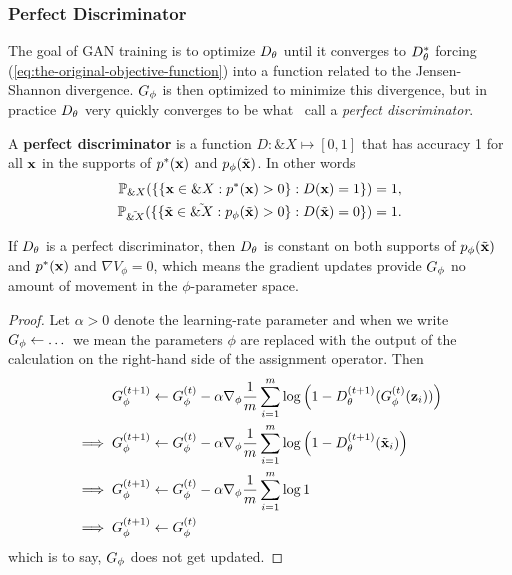 
\subsubsection*{Perfect Discriminator}

The goal of GAN training is to optimize $D_\theta$ until it converges to
$D_\theta^*$ forcing (\ref{eq:the-original-objective-function}) into a
function related to the Jensen-Shannon divergence.  $G_\phi$ is then
optimized to minimize this divergence, but in practice $D_\theta$ very
quickly converges to be what~\cite{ref:arjovsky-towards-2017} call a
\textit{perfect discriminator}.

\begin{definition} A \textbf{perfect discriminator} is a function $D:
  \&X \mapsto [0,1]$ that has accuracy 1 for all $\mathbf{x}$ in the supports
  of $p^*(\mathbf{x})$ and $p_{\phi}(\tilde{\mathbf{x}})$. In other words
  \begin{align} \mathbb{P}_{\&X}(\{\{\mathbf{x} \in \&X : p^*(\mathbf{x}) > 0\} : D(\mathbf{x})
    = 1 \} )= 1, \\ \mathbb{P}_{\tilde{\&X}}(\{\{\tilde{\mathbf{x}} \in
    \tilde{\&X} : p_{\phi}(\tilde{\mathbf{x}}) > 0\} : D(\tilde{\mathbf{x}}) = 0 \} )= 1.
  \end{align}
\end{definition}

\begin{theorem} If $D_\theta$ is a perfect discriminator, then $D_\theta$ is
  constant on both supports of $p_{\phi}(\tilde{\mathbf{x}})$ and $p^*(\mathbf{x})$ and $\nabla{V_\phi} = 0$,
  which means the gradient updates provide $G_\phi$ no amount of movement in
  the $\phi$-parameter space.
\end{theorem}

\begin{proof} Let $\alpha>0$ denote the learning-rate parameter and
  when we write $G_\phi \gets \dots$ we mean the parameters $\phi$ are
  replaced with the output of the calculation on the right-hand side of
  the assignment operator. Then
  \begin{align}
    \label{eq:g-updates-no-good}
    G_\phi^{(t+1)} & \gets G_\phi^{(t)} -
                 \alpha\nabla_\phi {1 \over m} \sum_{i=1}^m \log\left( 1 -
                 D_\theta^{(t+1)}(G_\phi^{(t)}(\mathbf{z}_i)) \right) \\
    \implies G_\phi^{(t+1)} & \gets
                          G_\phi^{(t)} - \alpha\nabla_\phi {1 \over m} \sum_{i=1}^m \log{ \left( 1 -
                          D_\theta^{(t+1)}(\tilde{\mathbf{x}}_i) \right)} \\ \implies
    G_\phi^{(t+1)}
               & \gets
                 G_\phi^{(t)} - \alpha\nabla_\phi {1 \over m} \sum_{i=1}^m \log{1} \\
    \implies G_\phi^{(t+1)}
               & \gets G_\phi^{(t)}
  \end{align} which is to say, $G_\phi$ does not get updated.
\end{proof}

